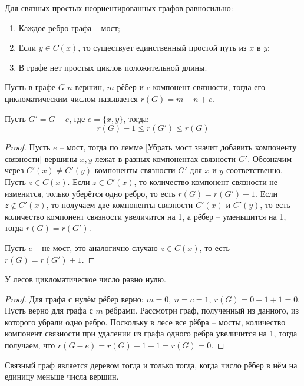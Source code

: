 \documentclass[12pt]{article}
\begin{document}
\begin{consequence}
	Для связных простых неориентированных графов равносильно:
	\begin{enumerate}
		\item Каждое ребро графа -- мост;
		\item Если $y\in C(x)$, то существует единственный простой путь из $x$ в $y$;
		\item В графе нет простых циклов положительной длины.
	\end{enumerate}
\end{consequence}
\begin{definition}
	Пусть в графе $G$ $n$ вершин, $m$ рёбер и $c$ компонент связности,
	тогда его цикломатическим числом называется $r(G)=m-n+c$.
\end{definition}
\begin{statement}
	Пусть $G'=G-e$, где $e=\{x, y\}$, тогда:
	\[r(G)-1\leqslant r(G')\leqslant r(G)\]
	\begin{proof}
		Пусть $e$ -- мост, тогда по лемме \ref{Убрать мост значит добавить
		компоненту связности} вершины $x, y$ лежат в разных компонентах
		связности $G'$. Обозначим через $C'(x)\neq C'(y)$ компоненты
		связности $G'$ для $x$ и $y$ соответственно. Пусть $z\in C(x)$.
		Если $z\in C'(x)$, то количество компонент связности не изменится,
		только уберётся одно ребро, то есть $r(G)=r(G')+1$. Если $z\notin
		C'(x)$, то получаем две компоненты связности $C'(x)$ и $C'(y)$, то
		есть количество компонент связности увеличится на 1, а рёбер --
		уменьшится на 1, тогда $r(G)=r(G')$.\par

		Пусть $e$ -- не мост, это аналогично случаю $z\in C(x)$, то есть
		$r(G)=r(G')+1$.
	\end{proof}
\end{statement}
\begin{theorem}
	У лесов цикломатическое число равно нулю.
	\begin{proof}
		Для графа с нулём рёбер верно: $m=0,\ n=c=1,\ r(G)=0-1+1=0$. Пусть
		верно для графа с $m$ рёбрами. Рассмотри граф, полученный из
		данного, из которого убрали одно ребро. Поскольку в лесе все рёбра
		-- мосты, количество компонент связности при удалении из графа
		одного ребра увеличится на 1, тогда получаем, что $r(G-e)=r(G)-1+1=r(G)=0$.
	\end{proof}
\end{theorem}
\begin{consequence}
	Связный граф является деревом тогда и только тогда, когда число
	рёбер в нём на единицу меньше числа вершин.
\end{consequence}
\end{document}
